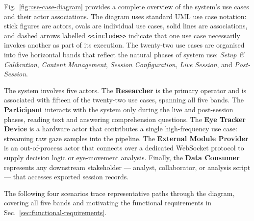 Fig.~\ref{fig:use-case-diagram} provides a complete overview of the system's use cases
and their actor associations.
The diagram uses standard UML use case notation: stick figures are actors, ovals are
individual use cases, solid lines are associations, and dashed arrows labelled
\texttt{<<include>>} indicate that one use case necessarily invokes another as part
of its execution.
The twenty-two use cases are organised into five horizontal bands that reflect the
natural phases of system use: \textit{Setup \& Calibration}, \textit{Content Management},
\textit{Session Configuration}, \textit{Live Session}, and \textit{Post-Session}.

The system involves five actors.
The \textbf{Researcher} is the primary operator and is associated with fifteen of the
twenty-two use cases, spanning all five bands.
The \textbf{Participant} interacts with the system only during the live and post-session
phases, reading text and answering comprehension questions.
The \textbf{Eye Tracker Device} is a hardware actor that contributes a single
high-frequency use case: streaming raw gaze samples into the pipeline.
The \textbf{External Module Provider} is an out-of-process actor that connects over a
dedicated WebSocket protocol to supply decision logic or eye-movement analysis.
Finally, the \textbf{Data Consumer} represents any downstream stakeholder --- analyst,
collaborator, or analysis script --- that accesses exported session records.

The following four scenarios trace representative paths through the diagram, covering
all five bands and motivating the functional requirements in
Sec.~\ref{sec:functional-requirements}.

\usetikzlibrary{shapes.geometric}

